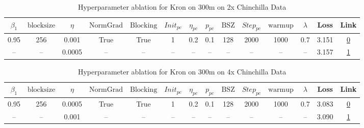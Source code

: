 \begin{table}[H]
\centering
\caption{Hyperparameter ablation for Kron on 300m on 2x Chinchilla Data}
\label{tab:ablation_kron_300m_2}
\begin{tabular}{cccccccccccccc}
\toprule
$\beta_1$ & $\mathrm{block size}$ & $\eta$ & $\mathrm{NormGrad}$ & $\mathrm{Blocking}$ & $Init_{pc}$ & $\eta_{pc}$ & $p_{pc}$ & $\mathrm{BSZ}$ & $Step_{pc}$ & $\mathrm{warmup}$ & $\lambda$ & Loss & Link \\
\midrule
0.95 & 256 & 0.001 & True & True & 1 & 0.2 & 0.1 & 128 & 2000 & 1000 & 0.7 & 3.151 & \href{https://wandb.ai/stanford-mercury/optimizer-scaling/runs/sweep-300m-12B-kronb21812lr0.001-wd0.7-b10.95-plr0.2-pis1-gn1-no-48c292}{0} \\
\midrule
-- & -- & 0.0005 & -- & -- & -- & -- & -- & -- & -- & -- & -- & 3.157 & \href{https://wandb.ai/stanford-mercury/optimizer-scaling/runs/sweep-300m-12B-kron7436a9lr0.0005-wd0.7-b10.95-plr0.2-pis1-gn1-n-68efd2}{1} \\
\bottomrule
\end{tabular}
\end{table}

\begin{table}[H]
\centering
\caption{Hyperparameter ablation for Kron on 300m on 4x Chinchilla Data}
\label{tab:ablation_kron_300m_4}
\begin{tabular}{cccccccccccccc}
\toprule
$\beta_1$ & $\mathrm{block size}$ & $\eta$ & $\mathrm{NormGrad}$ & $\mathrm{Blocking}$ & $Init_{pc}$ & $\eta_{pc}$ & $p_{pc}$ & $\mathrm{BSZ}$ & $Step_{pc}$ & $\mathrm{warmup}$ & $\lambda$ & Loss & Link \\
\midrule
0.95 & 256 & 0.0005 & True & True & 1 & 0.2 & 0.1 & 128 & 2000 & 1000 & 0.7 & 3.083 & \href{https://wandb.ai/stanford-mercury/optimizer-scaling/runs/sweep-300m-24B-kronb55572lr0.0005-wd0.7-b10.95-plr0.2-pis1-gn1-n-9479df}{0} \\
\midrule
-- & -- & 0.001 & -- & -- & -- & -- & -- & -- & -- & -- & -- & 3.090 & \href{https://wandb.ai/stanford-mercury/optimizer-scaling/runs/sweep-300m-24B-kron7aa525lr0.001-wd0.7-b10.95-plr0.2-pis1-gn1-no-127f30}{1} \\
\bottomrule
\end{tabular}
\end{table}

